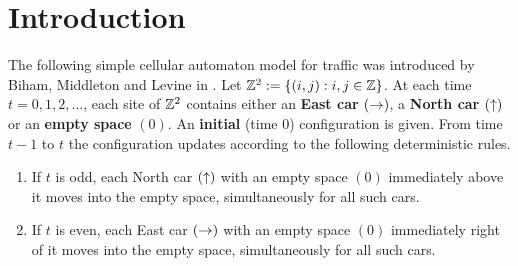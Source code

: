 \documentclass[reqno]{amsart}
\begin{document}
\begin{abstract}
    A configuration of East cars and North cars is initialised on the $n$-by-$n$ integer lattice. At each odd time step each North car moves one site North if the site directly above it is vacant and leaves the grid if it is on the top row. At each even time step East cars move similarly East. We investigate the time until the grid clears of all cars. In particular, we provide simulation evidence of superlinear clearing times asymptotically in $n$ arising from random and periodic configurations. We further give an upper bound of order $n^2$ for the maximal clearing time of the grid.
\end{abstract}

\maketitle

\section{Introduction}

The following simple cellular automaton model for traffic was introduced by Biham, Middleton and Levine in \cite{bmlmodel}. Let $\mathbb{Z}^2 := \{ (i,j) : i, j \in \mathbb{Z} \}$. At each time $t=0,1,2,\ldots$, each site of $\mathbb{Z}^2$ contains either an \textbf{East car} $(\mathord{\rightarrow})$, a \textbf{North car} $(\mathord{\uparrow})$ or an \textbf{empty space} $(0)$. An \textbf{initial} (time $0$) configuration is given. From time $t-1$ to $t$ the configuration updates according to the following deterministic rules.
\begin{enumerate}
    \item[$(i)$] If $t$ is odd, each North car $(\mathord{\uparrow})$ with an empty space $(0)$ immediately above it moves into the empty space, simultaneously for all such cars.
    \item[$(ii)$] If $t$ is even, each East car $(\mathord{\rightarrow})$ with an empty space $(0)$ immediately right of it moves into the empty space, simultaneously for all such cars.
\end{enumerate}
\end{document}
